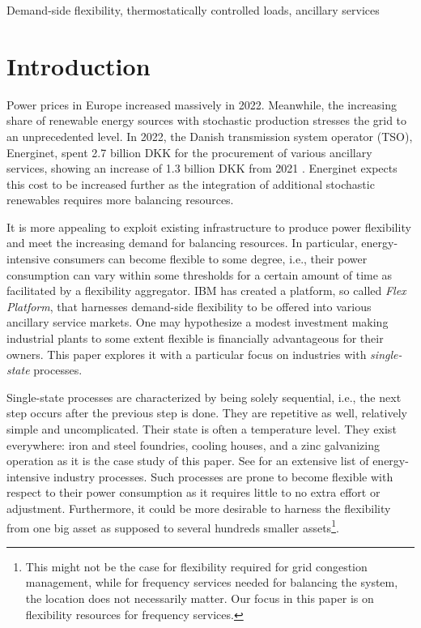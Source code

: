 \documentclass[conference]{IEEEtran}
\begin{document}
\vspace{1mm}
\begin{IEEEkeywords}
    Demand-side flexibility, thermostatically controlled loads, ancillary services
\end{IEEEkeywords}


\section{Introduction}
\vspace{-1mm}
Power prices in Europe increased massively in 2022. Meanwhile, the increasing share of renewable energy sources with stochastic production stresses the grid to an unprecedented level. In 2022, the Danish transmission system operator (TSO), Energinet, spent 2.7 billion DKK for the procurement of various ancillary services, showing an increase of 1.3 billion DKK from 2021 \cite{energinetOmkostninger}. Energinet expects this cost to be increased further as the integration of additional stochastic renewables requires more balancing resources.

It is more appealing to exploit existing infrastructure to produce power flexibility and  meet the increasing demand for balancing resources. In particular, energy-intensive consumers can become flexible to some degree, i.e., their power consumption can vary within some thresholds for a certain amount of time as facilitated by a flexibility aggregator. IBM has created a platform, so called \textit{Flex Platform}, that harnesses demand-side flexibility to be offered into various ancillary service markets. One may hypothesize a modest investment making industrial plants  to some extent flexible is financially advantageous for their owners. This paper explores it with a particular focus on industries with \textit{single-state} processes. 

Single-state processes are characterized by being solely sequential, i.e., the next step occurs after the previous step is done. They are repetitive as well, relatively simple and uncomplicated. Their state is often a temperature level. They exist everywhere: iron and steel foundries, cooling houses, and a zinc galvanizing operation as it is the case study of this paper. See \cite{paulus2011potential} for an extensive list of energy-intensive industry processes. Such processes are prone to become flexible with respect to their power consumption as it requires little to no extra effort or adjustment. Furthermore, it could be more desirable to harness the flexibility from one big asset as supposed to several hundreds smaller assets\footnote{This might not be the case for flexibility required for grid congestion management, while for frequency services needed for balancing the system, the location does not necessarily matter. Our focus in this paper is on flexibility resources for frequency services.}.
\end{document}
